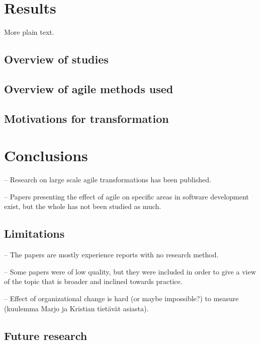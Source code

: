 \documentclass[lnbip]{svmultln}
\begin{document}
\section{Results}
\label{sec:results}

More plain text.

\subsection{Overview of studies}

\lipsum[1]

\subsection{Overview of agile methods used}

\lipsum[1]

\subsection{Motivations for transformation}

\lipsum[1]


\section{Conclusions}
\label{sec:conclusions}

-- Research on large scale agile transformations has been published.

-- Papers presenting the effect of agile on specific areas in software
development exist, but the whole has not been studied as much.

\subsection{Limitations}

-- The papers are mostly experience reports with no research method.

-- Some papers were of low quality, but they were included in order to give a
view of the topic that is broader and inclined towards practice.

-- Effect of organizational change is hard (or maybe impossible?) to measure
(kuulemma Marjo ja Kristian tietävät asiasta).

\subsection{Future research}
\end{document}
